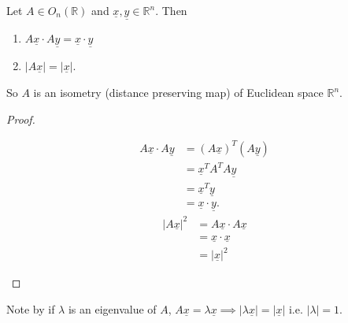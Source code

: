 \begin{lemma}\label{lem:20}
    Let $A \in O_n(\mathbb{R})$ and $\underline{x}, \underline{y} \in \mathbb{R}^n$. Then
    \begin{enumerate}
        \item $A \underline{x} \cdot A \underline{y} = \underline{x} \cdot \underline{y}$
        \item $|A \underline{x}| = |\underline{x}|$. \label{07-itm-2}
    \end{enumerate} 
    So $A$ is an isometry (distance preserving map) of Euclidean space $\mathbb{R}^n$.
\end{lemma} 

\begin{proof} ~
    \begin{enumerate}
        \mathitem \begin{align*}
            A \underline{x} \cdot A \underline{y} &= (A \underline{x})^T (A \underline{y}) \\
            &= \underline{x}^T A^T A \underline{y} \\
            &= \underline{x}^T \underline{y} \\
            &= \underline{x} \cdot \underline{y}.
        \end{align*} 
        \mathitem \begin{align*}
            |A \underline{x}|^2 &= A \underline{x} \cdot A \underline{x} \\
            &= \underline{x} \cdot \underline{x} \\
            &= |\underline{x}|^2
        \end{align*} 
    \end{enumerate} 
\end{proof} 

Note by  if $\lambda$ is an eigenvalue of $A$, $A \underline{x} = \lambda \underline{x} \implies |\lambda \underline{x}| = |\underline{x}|$ i.e. $|\lambda| = 1$.

